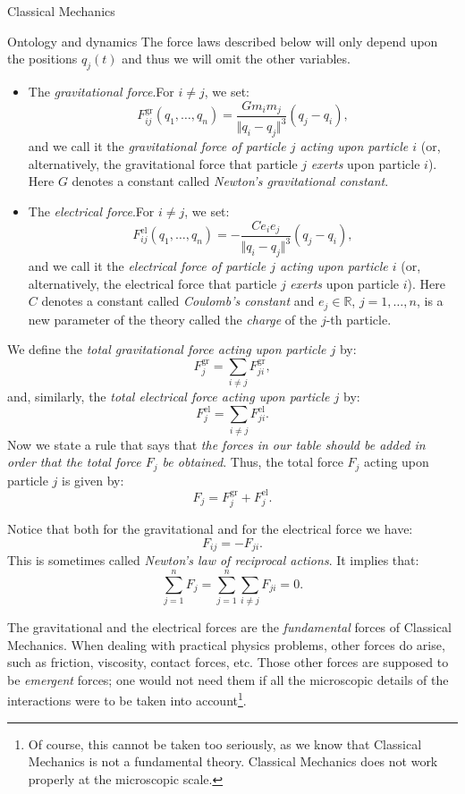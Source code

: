 \documentclass[oneside,a4paper,11pt]{amsbook}
\newcommand{\R}{\mathds R}
\theoremstyle{remark}\newtheorem{exercise}{Exercise}[chapter]
\theoremstyle{plain}\newtheorem{teo}{Theorem}[section]
\theoremstyle{plain}\newtheorem{lem}[teo]{Lemma}
\theoremstyle{plain}\newtheorem{prop}[teo]{Proposition}
\theoremstyle{plain}\newtheorem{cor}[teo]{Corollary}
\theoremstyle{definition}\newtheorem{defin}[teo]{Definition}
\theoremstyle{remark}\newtheorem{rem}[teo]{Remark}
\theoremstyle{definition}\newtheorem{notation}[teo]{Notation}
\theoremstyle{definition}\newtheorem{convention}[teo]{Convention}
\theoremstyle{definition}\newtheorem{example}[teo]{Example}
\numberwithin{section}{chapter}
\numberwithin{equation}{section}
\begin{document}
\begin{chapter}{Classical Mechanics}
\begin{section}{Ontology and dynamics}
The force laws described below will only depend upon the positions $q_j(t)$ and thus we will omit the other variables.
\begin{itemize}
\item The {\em gravitational force}.\enspace For $i\ne j$, we set:
\[F_{ij}^{\mathrm{gr}}(q_1,\ldots,q_n)=\frac{Gm_im_j}{\Vert q_i-q_j\Vert^3}(q_j-q_i),\]
and we call it the {\em gravitational force of particle $j$ acting upon particle $i$\/} (or, alternatively,
the gravitational force that particle $j$ {\em exerts\/} upon particle $i$). Here $G$ denotes
a constant called {\em Newton's gravitational constant}.
\item The {\em electrical force}.\enspace For $i\ne j$, we set:
\[F_{ij}^{\mathrm{el}}(q_1,\ldots,q_n)=-\frac{Ce_ie_j}{\Vert q_i-q_j\Vert^3}(q_j-q_i),\]
and we call it the {\em electrical force of particle $j$ acting upon particle $i$\/} (or, alternatively,
the electrical force that particle $j$ {\em exerts\/} upon particle $i$). Here $C$ denotes
a constant called {\em Coulomb's constant\/} and $e_j\in\R$, $j=1,\ldots,n$, is a new parameter of the theory
called the {\em charge\/} of the $j$-th particle.
\end{itemize}
We define the {\em total gravitational force acting upon particle $j$\/} by:
\[F_j^{\mathrm{gr}}=\sum_{i\ne j}F_{ji}^{\mathrm{gr}},\]
and, similarly, the {\em total electrical force acting upon particle $j$\/} by:
\[F_j^{\mathrm{el}}=\sum_{i\ne j}F_{ji}^{\mathrm{el}}.\]
Now we state a rule that says that {\em the forces in our table should be added in order that the total
force $F_j$ be obtained}. Thus, the total force $F_j$ acting upon particle $j$ is given by:
\[F_j=F_j^{\mathrm{gr}}+F_j^{\mathrm{el}}.\]

Notice that both for the gravitational and for the electrical force we have:
\begin{equation}\label{eq:actionreaction}
F_{ij}=-F_{ji}.
\end{equation}
This is sometimes called {\em Newton's law of reciprocal actions}. It implies that:
\begin{equation}\label{eq:totalforcezero}
\sum_{j=1}^nF_j=\sum_{j=1}^n\sum_{i\ne j}F_{ji}=0.
\end{equation}

\medskip

The gravitational and the electrical forces are the {\em fundamental\/} forces of Classical Mechanics. When dealing with
practical physics problems, other forces do arise, such as friction, viscosity, contact forces, etc. Those other forces
are supposed to be {\em emergent\/} forces; one would not need them if all the microscopic details of the interactions
were to be taken into account\footnote{%
Of course, this cannot be taken too seriously, as we know that Classical Mechanics is not a fundamental theory.
Classical Mechanics does not work properly at the microscopic scale.}.


\end{section}
\end{chapter}
\end{document}
